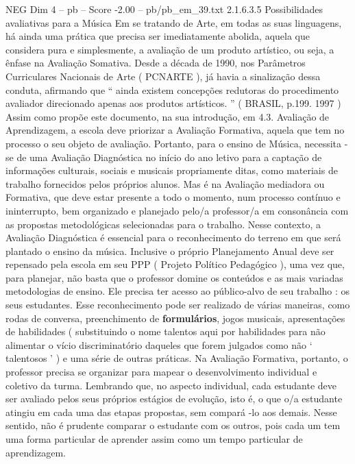 \begin{textsample}{NEG Dim 4 – pb – Score -2.00 – pb/pb\_em\_39.txt}  \label{ex:f4_neg_029}
2.1.6.3.5 Possibilidades avaliativas para a Música Em se tratando de Arte, em todas as suas linguagens, há ainda uma prática que precisa ser imediatamente abolida, aquela que considera pura e simplesmente, a avaliação de um produto artístico, ou seja, a ênfase na Avaliação Somativa.
Desde a década de 1990, nos Parâmetros Curriculares Nacionais de Arte ( PCNARTE ), já havia a sinalização dessa conduta, afirmando que “ ainda existem concepções redutoras do procedimento avaliador direcionado apenas aos produtos artísticos. ” ( BRASIL, p.199. 1997 ) Assim como propõe este documento, na sua introdução, em 4.3.
Avaliação de Aprendizagem, a escola deve priorizar a Avaliação Formativa, aquela que tem no processo o seu objeto de avaliação.
Portanto, para o ensino de Música, necessita -se de uma Avaliação Diagnóstica no início do ano letivo para a captação de informações culturais, sociais e musicais propriamente ditas, como materiais de trabalho fornecidos pelos próprios alunos.
Mas é na Avaliação mediadora ou Formativa, que deve estar presente a todo o momento, num processo contínuo e ininterrupto, bem organizado e planejado pelo/a professor/a em consonância com as propostas metodológicas selecionadas para o trabalho.
Nesse contexto, a Avaliação Diagnóstica é essencial para o reconhecimento do terreno em que será plantado o ensino da música.
Inclusive o próprio Planejamento Anual deve ser repensado pela escola em seu PPP ( Projeto Político Pedagógico ), uma vez que, para planejar, não basta que o professor domine os conteúdos e as mais variadas metodologias de ensino.
Ele precisa ter acesso ao público-alvo de seu trabalho : os seus estudantes.
Esse reconhecimento pode ser realizado de várias maneiras, como rodas de conversa, preenchimento de \textbf{formulários}, jogos musicais, apresentações de habilidades ( substituindo o nome talentos aqui por habilidades para não alimentar o vício discriminatório daqueles que forem julgados como não ‘ talentosos ’ ) e uma série de outras práticas.
Na Avaliação Formativa, portanto, o professor precisa se organizar para mapear o desenvolvimento individual e coletivo da turma.
Lembrando que, no aspecto individual, cada estudante deve ser avaliado pelos seus próprios estágios de evolução, isto é, o que o/a estudante atingiu em cada uma das etapas propostas, sem compará -lo aos demais.
Nesse sentido, não é prudente comparar o estudante com os outros, pois cada um tem uma forma particular de aprender assim como um tempo particular de aprendizagem.

\end{textsample}
